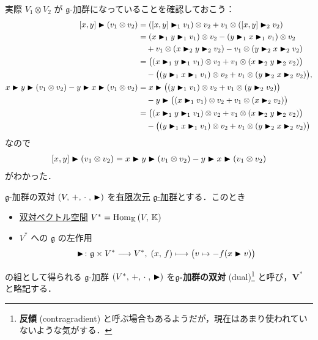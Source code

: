 \documentclass[rep_main]{subfiles}
\begin{document}
実際 $V_1 \otimes V_2$ が $\mathfrak{g}$-加群になっていることを確認しておこう：
\begin{align}
	\comm{x}{y} \btr (v_1 \otimes v_2)
	&= (\comm{x}{y} \btr_1 v_1) \otimes v_2 + v_1 \otimes (\comm{x}{y} \btr_2 v_2) \\
	&= (x \btr_1 y \btr_1 v_1) \otimes v_2 - (y \btr_1 x \btr_1 v_1) \otimes v_2 \\
	&\quad + v_1 \otimes (x \btr_2 y \btr_2 v_2) - v_1 \otimes (y \btr_2 x \btr_2 v_2) \\
	&= \bigl( (x \btr_1 y \btr_1 v_1) \otimes v_2 + v_1 \otimes (x \btr_2 y \btr_2 v_2) \bigr) \\
	&\quad - \bigl( (y \btr_1 x \btr_1 v_1) \otimes v_2 + v_1 \otimes (y \btr_2 x \btr_2 v_2) \bigr), \\
	x \btr y \btr (v_1 \otimes v_2) - y \btr x \btr (v_1 \otimes v_2)
	&= x \btr \bigl( (y \btr_1 v_1) \otimes v_2 + v_1 \otimes (y \btr_2 v_2) \bigr) \\
	&\quad - y \btr \bigl( (x \btr_1 v_1) \otimes v_2 + v_1 \otimes (x \btr_2 v_2) \bigr) \\
	&= \bigl( (x \btr_1 y \btr_1 v_1) \otimes v_2 + v_1 \otimes (x \btr_2 y \btr_2 v_2) \bigr) \\
	&\quad - \bigl( (y \btr_1 x \btr_1 v_1) \otimes v_2 + v_1 \otimes (y \btr_2 x \btr_2 v_2) \bigr)
\end{align}
なので
\begin{align}
	\comm{x}{y} \btr (v_1 \otimes v_2)  = x \btr y \btr (v_1 \otimes v_2) - y \btr x \btr (v_1 \otimes v_2)
\end{align}
がわかった．

\begin{mydef}[label=def:gmod-dual]{$\mathfrak{g}$-加群の双対}
	$(V,\, +,\, \cdot\;,\, \blacktriangleright)$ を\underline{有限次元} \hyperref[ax:g-module]{ $\mathfrak{g}$-加群}とする．このとき
	\begin{itemize}
		\item \hyperref[def:hom-vec]{双対ベクトル空間} $V^* = \mathrm{Hom}_{\mathbb{K}} \mathop{}(V,\, \mathbb{K})$
		\item $V^*$ への $\mathfrak{g}$ の左作用
		\begin{align}
			\blacktriangleright \colon \mathfrak{g} \times V^* \longrightarrow V^*,\; (x,\, f) \longmapsto \bigl(v \mapsto - f(x \blacktriangleright v)\bigr)
		\end{align}
	\end{itemize}
	の組として得られる $\mathfrak{g}$-加群 $(V^*,\, +,\, \cdot\;,\, \blacktriangleright)$ を\textbf{$\bm{\mathfrak{g}}$-加群の双対} (dual)\footnote{\textbf{反傾} (contragradient) と呼ぶ場合もあるようだが，現在はあまり使われていないような気がする．} と呼び，$\bm{V^*}$ と略記する．
	
\end{mydef}
\end{document}
